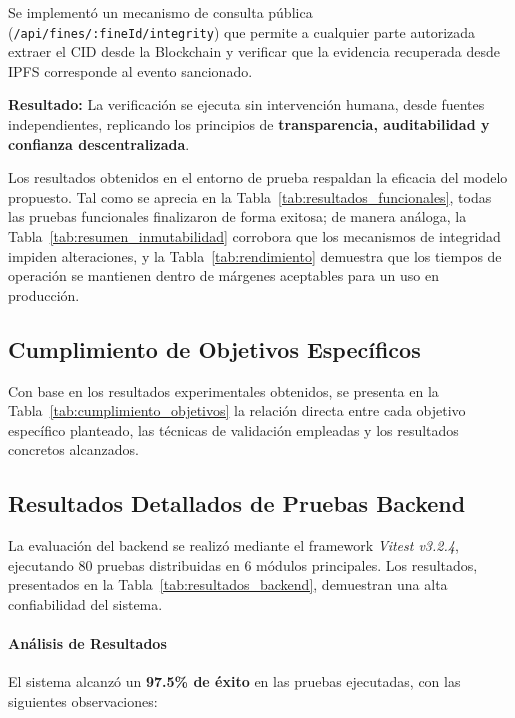 Se implementó un mecanismo de consulta pública (\texttt{/api/fines/:fineId/integrity}) que permite a cualquier parte autorizada extraer el CID desde la Blockchain y verificar que la evidencia recuperada desde IPFS corresponde al evento sancionado.

\textbf{Resultado:} La verificación se ejecuta sin intervención humana, desde fuentes independientes, replicando los principios de \textbf{transparencia, auditabilidad y confianza descentralizada}.




Los resultados obtenidos en el entorno de prueba respaldan la eficacia del modelo propuesto. Tal como se aprecia en la Tabla~\ref{tab:resultados_funcionales}, todas las pruebas funcionales finalizaron de forma exitosa; de manera análoga, la Tabla~\ref{tab:resumen_inmutabilidad} corrobora que los mecanismos de integridad impiden alteraciones, y la Tabla~\ref{tab:rendimiento} demuestra que los tiempos de operación se mantienen dentro de márgenes aceptables para un uso en producción.

\subsection{Cumplimiento de Objetivos Específicos}

Con base en los resultados experimentales obtenidos, se presenta en la Tabla~\ref{tab:cumplimiento_objetivos} la relación directa entre cada objetivo específico planteado, las técnicas de validación empleadas y los resultados concretos alcanzados.



\subsection{Resultados Detallados de Pruebas Backend}

La evaluación del backend se realizó mediante el framework \textit{Vitest v3.2.4}, ejecutando 80 pruebas distribuidas en 6 módulos principales. Los resultados, presentados en la Tabla~\ref{tab:resultados_backend}, demuestran una alta confiabilidad del sistema.



\paragraph{Análisis de Resultados}
El sistema alcanzó un \textbf{97.5\% de éxito} en las pruebas ejecutadas, con las siguientes observaciones:


